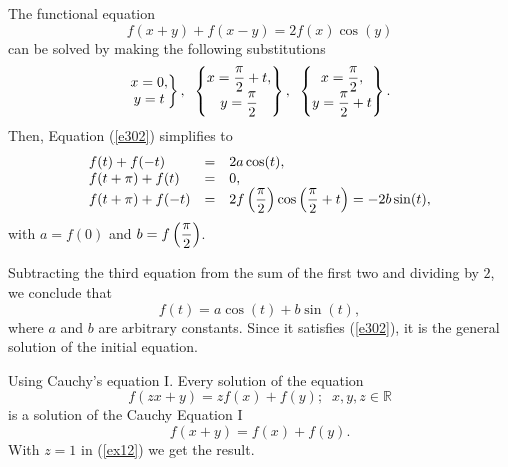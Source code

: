\documentclass[
	11pt, %
	fleqn, %
	a4paper, %
]{LegrandOrangeBook}
\newcommand{\R}{\mathbb{R}}
\begin{document}
\begin{example} The functional equation
\begin{equation}\label{e302}
f(x+y)+f(x-y)=2f(x)\cos (y)
\end{equation}
can be solved by making the
following
substitutions
\begin{displaymath}
\left. \begin{matrix}x=0,\\
y=t\end{matrix} \right\},\;\;\left\{ \begin{matrix}x={\displaystyle {\pi  \over 2}}+t,\\
y={\displaystyle {\pi  \over 2}}\end{matrix} \right\},\;\;\left\{ \begin{matrix}x={\displaystyle {\pi
\over 2}},\\ y={\displaystyle {\pi \over 2}}+t\end{matrix} \right\}.
\end{displaymath}
Then, Equation (\ref{e302}) simplifies to
\begin{displaymath}
\begin{array}{lll}
f(t)+f(-t) & = & 2a\cos (t),\\
f(t+\pi )+f(t) & = & 0,\\
f(t+\pi )+f(-t) & = & 2f\left({\displaystyle {\pi  \over 2}}\right)\cos \left({\displaystyle {\pi
\over 2}}+t\right)=-2b \sin (t),\\
\end{array}
\end{displaymath}
with $a  = f(0)$ and $b  =  f\left({\displaystyle {\pi  \over 2}}\right)$.

Subtracting the third equation from the sum of the first two and
dividing by $2$, we conclude that
\begin{displaymath}
f(t)=a\cos (t)+b \sin (t),
\end{displaymath}
where $a$ and $b$ are arbitrary constants. Since
it satisfies (\ref{e302}), it is the general solution of the initial equation.
\end{example}

\begin{example}{Using Cauchy's equation I. }
Every solution of the equation
\begin{equation}\label{ex12}
f(zx+y)=zf(x)+f(y);\;\;x,y,z\in \R
\end{equation}
is a solution of the Cauchy Equation I
\begin{displaymath}
f(x+y)=f(x)+f(y).
\end{displaymath}
 With $z=1$ in (\ref{ex12}) we get the
result.
\end{example}
\end{document}

